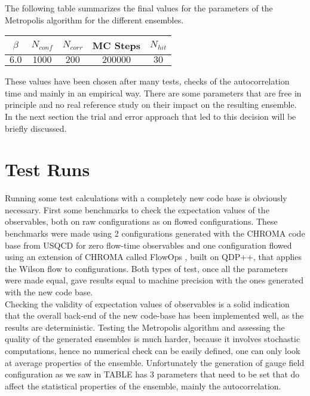 The following table summarizes the final values for the parameters of the Metropolis algorithm for the different ensembles.
\begin{table}[!htb]
    \begin{center}
    \begin{tabular}{ccccc}
        $\beta$ & $N_{conf}$ & $N_{corr}$ & MC Steps & $N_{hit}$ \\\hline
        $6.0$ & $1000$ & $200$ & $200000$ & $30$
    \end{tabular}
    \label{runs:mcparams}
    \end{center}
\end{table}
These values have been chosen after many tests, checks of the autocorrelation time and mainly in an empirical way. There are some parameters that are free in principle and no real reference study on their impact on the resulting ensemble. In the next section the trial and error approach that led to this decision will be briefly discussed.

\section{Test Runs}
\label{sec:testautocorr}
Running some test calculations with a completely new code base is obviously necessary. First some benchmarks to check the expectation values of the observables, both on raw configurations as on flowed configurations. These benchmarks were made using 2 configurations generated with the CHROMA \CIT code base from USQCD for zero flow-time observables and one configuration flowed using an extension of CHROMA called FlowOps \CIT, built on QDP++, that applies the Wilson flow to configurations. Both types of test, once all the parameters were made equal, gave results equal to machine precision with the ones generated with the new code base.\\
Checking the validity of expectation values of observables is a solid indication that the overall back-end of the new code-base has been implemented well, as the results are deterministic. Testing the Metropolis algorithm and assessing the quality of the generated ensembles is much harder, because it involves stochastic computations, hence no numerical check can be easily defined, one can only look at average properties of the ensemble. Unfortunately the generation of gauge field configuration as we saw in \LINK TABLE has 3 parameters that need to be set that do affect the statistical properties of the ensemble, mainly the autocorrelation. \\

